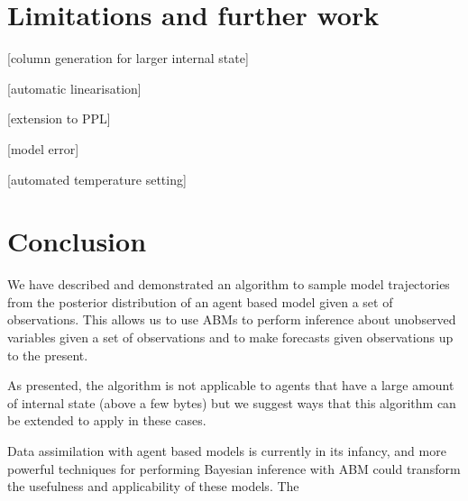 \documentclass{article}
\begin{document}
\section{Limitations and further work}

[column generation for larger internal state]

[automatic linearisation]

[extension to PPL]

[model error]

[automated temperature setting]

\section{Conclusion}

We have described and demonstrated an algorithm to sample model trajectories from the posterior distribution of an agent based model given a set of observations. This allows us to use ABMs to perform inference about unobserved variables given a set of observations and to make forecasts given observations up to the present.

As presented, the algorithm is not applicable to agents that have a large amount of internal state (above a few bytes) but we suggest ways that this algorithm can be extended to apply in these cases.

Data assimilation with agent based models is currently in its infancy, and more powerful techniques for performing Bayesian inference with ABM could transform the usefulness and applicability of these models. The 

%
% 


\end{document}

